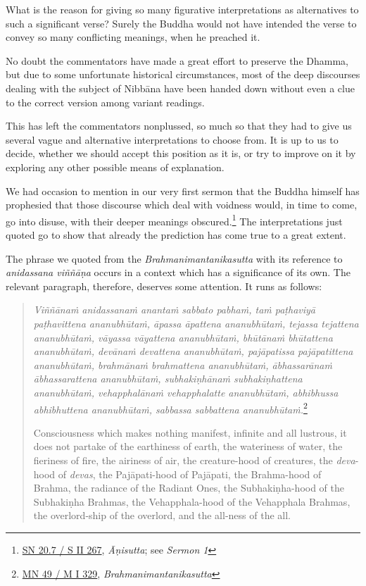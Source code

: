 What is the reason for giving so many figurative interpretations as alternatives to such a significant verse? Surely the Buddha would not have intended the verse to convey so many conflicting meanings, when he preached it.

No doubt the commentators have made a great effort to preserve the Dhamma, but due to some unfortunate historical circumstances, most of the deep discourses dealing with the subject of Nibbāna have been handed down without even a clue to the correct version among variant readings.

This has left the commentators nonplussed, so much so that they had to give us several vague and alternative interpretations to choose from. It is up to us to decide, whether we should accept this position as it is, or try to improve on it by exploring any other possible means of explanation.

We had occasion to mention in our very first sermon that the Buddha himself has prophesied that those discourse which deal with voidness would, in time to come, go into disuse, with their deeper meanings obscured.\footnote{\href{https://suttacentral.net/sn20.7/pli/ms}{SN 20.7 / S II 267}, \emph{Āṇisutta}; see \emph{Sermon 1}} The interpretations just quoted go to show that already the prediction has come true to a great extent.

The phrase we quoted from the \emph{Brahmanimantanikasutta} with its reference to \emph{anidassana viññāṇa} occurs in a context which has a significance of its own. The relevant paragraph, therefore, deserves some attention. It runs as follows:

\begin{quote}
\emph{Viññānaṁ anidassanaṁ anantaṁ sabbato pabhaṁ, taṁ paṭhaviyā paṭhavittena ananubhūtaṁ, āpassa āpattena ananubhūtaṁ, tejassa tejattena ananubhūtaṁ, vāyassa vāyattena ananubhūtaṁ, bhūtānaṁ bhūtattena ananubhūtaṁ, devānaṁ devattena ananubhūtaṁ, pajāpatissa pajāpatittena ananubhūtaṁ, brahmānaṁ brahmattena ananubhūtaṁ, ābhassarānaṁ ābhassarattena ananubhūtaṁ, subhakiṇhānaṁ subhakiṇhattena ananubhūtaṁ, vehapphalānaṁ vehapphalatte ananubhūtaṁ, abhibhussa abhibhuttena ananubhūtaṁ, sabbassa sabbattena ananubhūtaṁ.}\footnote{\href{https://suttacentral.net/mn49/pli/ms}{MN 49 / M I 329}, \emph{Brahmanimantanikasutta}}

Consciousness which makes nothing manifest, infinite and all lustrous, it does not partake of the earthiness of earth, the wateriness of water, the fieriness of fire, the airiness of air, the creature-hood of creatures, the \emph{deva}-hood of \emph{devas}, the Pajāpati-hood of Pajāpati, the Brahma-hood of Brahma, the radiance of the Radiant Ones, the Subhakiṇha-hood of the Subhakiṇha Brahmas, the Vehapphala-hood of the Vehapphala Brahmas, the overlord-ship of the overlord, and the all-ness of the all.
\end{quote}

